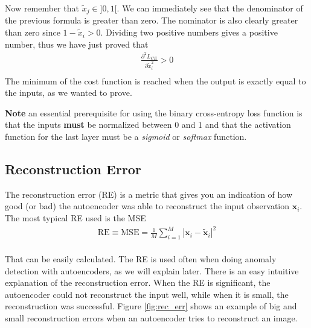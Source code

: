 \documentclass[12pt,a4]{article}
\newenvironment{note}
{\begin{mdframed}[backgroundcolor=light-gray, roundcorner=10pt,leftmargin=1, rightmargin=1, innerleftmargin=15, innertopmargin=15,innerbottommargin=15, outerlinewidth=1, linecolor=light-gray]}
{\end{mdframed}}
\begin{document}
Now remember that \(\tilde{x}_{j}\in ]0,1[\). We can immediately see that the denominator of the previous formula is greater than zero. The nominator is also clearly greater than zero since \( 1-\tilde{x}_{i}>0\). Dividing two positive numbers gives a positive number, thus we have just proved that 
\begin{equation}
\begin{split}
\frac{\partial^{2}L_{CE}}{\partial\tilde{x}_{i}^{2}}>0 \\ 
\end{split}
\end{equation}
The minimum of the cost function is reached when the output is exactly equal to the inputs, as we wanted to prove. 
\begin{note}
\textbf{Note} an essential prerequisite for using the binary cross-entropy loss function is that the inputs \textbf{must} be normalized between 0 and 1 and that the activation function for the last layer must be a \textit{sigmoid} or \textit{softmax} function.
\end{note}
\subsection{Reconstruction Error}

The reconstruction error (RE) is a metric that gives you an indication of how good (or bad) the autoencoder was able to reconstruct the input observation \(\mathbf{x}_{i}\). The most typical RE used is the MSE
\begin{equation}
\begin{split}
\textrm{RE}\equiv \textrm{MSE} = \frac{1}{M}\sum_{i = 1}^{M}\left\vert\mathbf{x}_{i}-\tilde{\mathbf{x}}_{i}\right\vert^{2}\\ 
\end{split}
\end{equation}



That can be easily calculated. The RE is used often when doing anomaly detection with autoencoders, as we will explain later. There is an easy intuitive explanation of the reconstruction error. When the RE is significant, the autoencoder could not reconstruct the input well, while when it is small, the reconstruction was successful. Figure \ref{fig:rec_err} shows an example of big and small reconstruction errors when an autoencoder tries to reconstruct an image.
\end{document}
